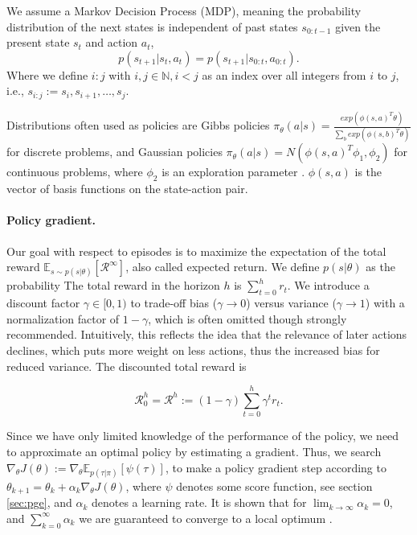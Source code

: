 We assume a Markov Decision Process (MDP), meaning the probability distribution of the next states is independent of past states $s_{0:t-1}$ given the present state $s_t$ and action $a_t$, 
\begin{equation}
	p(s_{t+1}|s_t,a_t)=p(s_{t+1}|s_{0:t},a_{0:t}).
\end{equation}
Where we define $i:j$ with $i,j \in \mathbb{N}, i < j$ as an index over all integers from $i$ to $j$, i.e., $s_{i:j} := s_i, s_{i+1}, \dots, s_j$. 

Distributions often used as policies are Gibbs policies $\pi_\theta(a|s) = \frac{exp(\phi(s,a)^T\theta)}{\sum_b exp(\phi(s,b)^T\theta)}$ \cite{Sutton:1999:PGM:3009657.3009806,Bagnell2004LearningD} for discrete problems, and Gaussian policies $\pi_\theta(a|s) = N(\phi(s,a)^T\phi_1,\phi_2)$ for continuous problems, where $\phi_2$ is an exploration parameter \cite{Williams92simplestatistical,peter:article:1996}. $\phi(s,a)$ is the vector of basis functions on the state-action pair.

\paragraph{Policy gradient.} Our goal with respect to episodes is to maximize the expectation of the total reward $\mathbb{E}_{s\sim p(s|\theta)}\left[\mathcal{R}^\infty\right]$, also called expected return. We define $p(s|\theta)$ as the probability The total reward in the horizon $h$ is $\sum_{t=0}^{h} r_{t}$. We introduce a discount factor $\gamma \in [0,1)$ to trade-off bias ($\gamma\to0$) versus variance ($\gamma\to1$) with a normalization factor of $1-\gamma$, which is often omitted though strongly recommended. Intuitively, this reflects the idea that the relevance of later actions declines, which puts more weight on less actions, thus the increased bias for reduced variance. The discounted total reward is 

\begin{equation}
  \mathcal{R}_0^h = \mathcal{R}^h := (1-\gamma) \sum_{t=0}^{h} \gamma^t r_t.
  \label{eqn:acc-reward}
\end{equation}

Since we have only limited knowledge of the performance of the policy, we need to approximate an optimal policy by estimating a gradient. Thus, we search $\nabla_\theta J(\theta) := \nabla_\theta \mathbb{E}_{p(\tau|\pi)}\left[\psi(\tau)\right]$, to make a policy gradient step according to $\theta_{k+1} = \theta_k + \alpha_k \nabla_\theta J(\theta)$, where $\psi$ denotes some score function, see section \ref{sec:pge}, and $\alpha_k$ denotes a learning rate. It is shown that for $\lim_{k\to\infty}\alpha_k = 0$, and $\sum_{k=0}^\infty \alpha_k$ we are guaranteed to converge to a local optimum \cite{Sutton:1999:PGM:3009657.3009806}.

